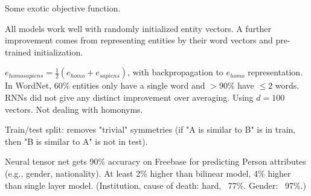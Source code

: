 Some exotic objective function.

All models work well with randomly initialized entity vectors.
A further improvement comes from representing entities by their word vectors
and pre-trained initialization.

$e_{homo sapiens} = \frac{1}{2}(e_{homo} + e_{sapiens})$, with backpropagation
to $e_{homo}$ representation.
In WordNet, 60\% entities only have a single word and $>90\%$ have $\leq 2$
words. RNNs did not give any distinct improvement over averaging.
Using $d=100$ vectors. Not dealing with homonyms.

Train/test split: removes "trivial" symmetries (if "A is similar to B" is in
train, then "B is similar to A" is not in test).

Neural tensor net gets 90\% accuracy on Freebase for predicting Person
attributes (e.g., gender, nationality). At least 2\% higher than bilinear model,
4\% higher than single layer model. (Institution, cause of death: hard, ~77\%.
Gender: ~97\%.)



